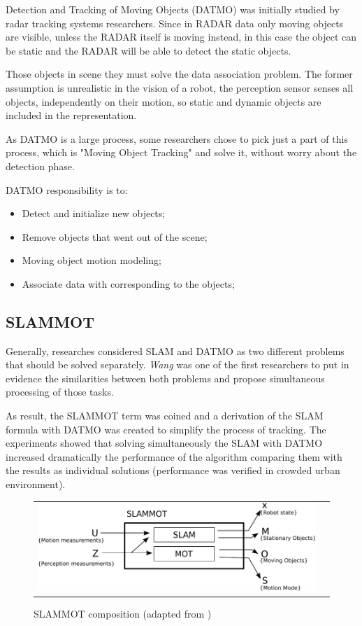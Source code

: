 Detection and Tracking of Moving Objects (DATMO) was initially studied by radar tracking systems \cite{VU-2009-454238} researchers. Since in RADAR data only moving objects are visible, unless the RADAR itself is moving instead, in this case the object can be static and the RADAR will be able to detect the static objects.

Those objects in scene they must solve the data association problem. The former assumption is unrealistic in the vision of a robot, the perception sensor senses all objects, independently on their motion, so static and dynamic objects are included in the representation.

As DATMO is a large process, some researchers chose to pick just a part of this process, which is "Moving Object Tracking" and solve it, without worry about the detection phase.

DATMO responsibility is to:

\begin{itemize}
\item Detect and initialize new objects;
\item Remove objects that went out of the scene;
\item Moving object motion modeling;
\item Associate data with corresponding to the objects;
\end{itemize}

\subsection{SLAMMOT}

Generally, researches considered SLAM and DATMO as two different problems that should be solved separately. \textit{Wang} was one of the first researchers to put in evidence the similarities between both problems and propose simultaneous processing of those tasks\cite{Wang03onlinesimultaneous}.

As result, the SLAMMOT term was coined and a derivation of the SLAM formula with DATMO was created to simplify the process of tracking. The experiments showed that solving simultaneously the SLAM with DATMO increased dramatically the performance of the algorithm comparing them with the results as individual solutions (performance was verified in crowded urban environment).

\begin{figure}[h]
   \centering
     \begin{tabular}{lr}
       \includegraphics[scale=0.9]{img/fig:slammot}
     \end{tabular}
   \caption{SLAMMOT composition (adapted from \cite{Wang04a})}
   \label{fig:slammot}
 \end{figure}

